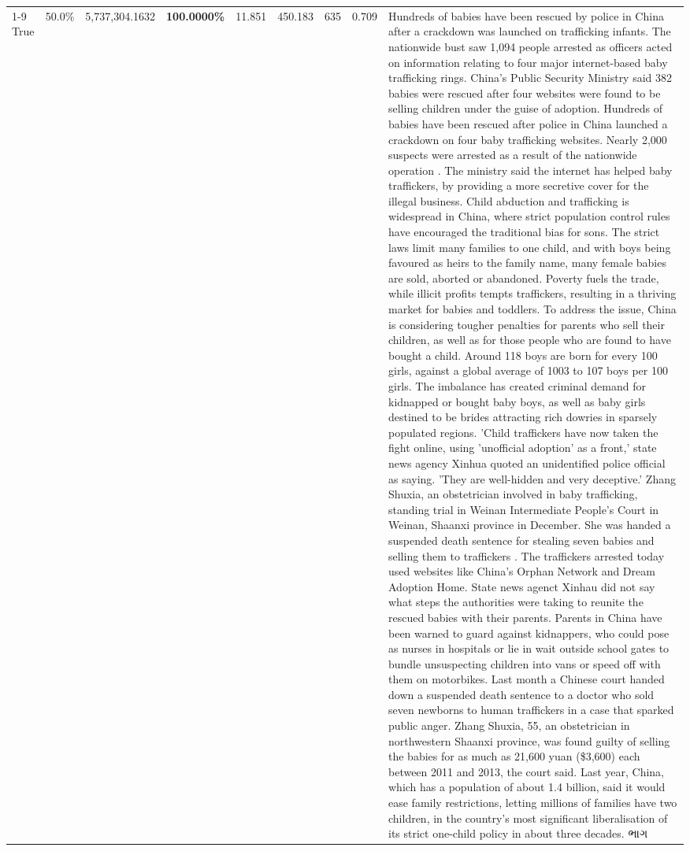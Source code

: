 \begin{table}[H]
\begin{tabular}{lllrlllll}
\cline{1-9}
True & 50.0\% & 5,737,304.1632 & \bfseries \color{red} 100.0000\% & 11.851 & 450.183 & 635 & 0.709 & Hundreds of babies have been rescued by police in China after a crackdown was launched on trafficking infants. The nationwide bust saw 1,094 people arrested as officers acted on information relating to four major internet-based baby trafficking rings. China's Public Security Ministry said 382 babies were rescued after four websites were found to be selling children under the guise of adoption. Hundreds of babies have been rescued after police in China launched a crackdown on four baby trafficking websites. Nearly 2,000 suspects were arrested as a result of the nationwide operation . The ministry said the internet has helped baby traffickers, by providing a more secretive cover for the illegal business. Child abduction and trafficking is widespread in China, where strict population control rules have encouraged the traditional bias for sons. The strict laws limit many families to one child, and with boys being favoured as heirs to the family name, many female babies are sold, aborted or abandoned. Poverty fuels the trade, while illicit profits tempts traffickers, resulting in a thriving market for babies and toddlers. To address the issue, China is considering tougher penalties for parents who sell their children, as well as for those people who are found to have bought a child. Around 118 boys are born for every 100 girls, against a global average of 1003 to 107 boys per 100 girls. The imbalance has created criminal demand for kidnapped or bought baby boys, as well as baby girls destined to be brides attracting rich dowries in sparsely populated regions. 'Child traffickers have now taken the fight online, using 'unofficial adoption' as a front,' state news agency Xinhua quoted an unidentified police official as saying. 'They are well-hidden and very deceptive.' Zhang Shuxia, an obstetrician involved in baby trafficking, standing trial in Weinan Intermediate People's Court in Weinan, Shaanxi province in December. She was handed a suspended death sentence for stealing seven babies and selling them to traffickers . The traffickers arrested today used websites like China's Orphan Network and Dream Adoption Home. State news agenct Xinhau did not say what steps the authorities were taking to reunite the rescued babies with their parents. Parents in China have been warned to guard against kidnappers, who could pose as nurses in hospitals or lie in wait outside school gates to bundle unsuspecting children into vans or speed off with them on motorbikes. Last month a Chinese court handed down a suspended death sentence to a doctor who sold seven newborns to human traffickers in a case that sparked public anger. Zhang Shuxia, 55, an obstetrician in northwestern Shaanxi province, was found guilty of selling the babies for as much as 21,600 yuan (\$3,600) each between 2011 and 2013, the court said. Last year, China, which has a population of about 1.4 billion, said it would ease family restrictions, letting millions of families have two children, in the country's most significant liberalisation of its strict one-child policy in about three decades. ભાગ \\

\end{tabular}
\end{table}
